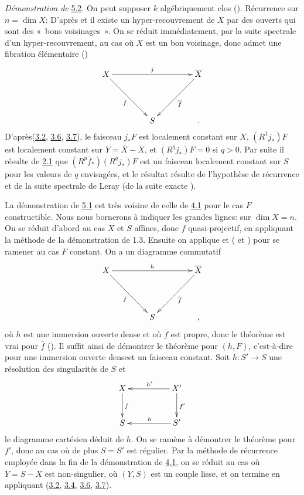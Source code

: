 \documentclass[10pt]{../fichiers-configuration-latex/smfart}
\begin{document}
\noindent
\emph{Démonstration de} \hyperref[XVI.thm5.2]{5.2}. On peut supposer $k$
algébriquement clos ().
Récurrence sur $n=\dim X$: D'après  et il existe un
hyper-recouvrement de $X$ par des ouverts qui sont des « bons
voisinages ». On se réduit immédiatement, par la suite spectrale
d'un hyper-recouvrement, au cas où $X$ est un bon voisinage, donc
admet une fibration élémentaire ()
$$
\xymatrix@=1.5cm{
X \ar[rr]^{j} \ar[rd]_{f}&         &
\bar{X}\ar[ld]^{\bar{f}} \\
             &      S  & .
}
$$
D'après\pageoriginale (\hyperref[XVI.prop3.2]{3.2}, \hyperref[XVI.cor3.6]{3.6}, \hyperref[XVI.thm3.7]{3.7}),
le faisceau $j_{\ast}F$ est
localement constant sur $X$, $(R^{1}j_{\ast})F$ est localement
constant sur $Y=\bar{X}-X$, et $(R^{q}j_{\ast})F=0$ si $q>0$. Par
suite il résulte de \hyperref[XVI.thm2.1]{2.1} que $(R^{p}\bar{f}_{\ast})(R^{q}j_{\ast})F$
est un faisceau localement constant sur $S$ pour les valeurs de $q$
envisagées, et le résultat résulte de l'hypothèse de récurrence et de
la suite spectrale de Leray (\resp de la suite exacte ).

La démonstration de \hyperref[XVI.thm5.1]{5.1} est très voisine 
de celle de \hyperref[XVI.thm4.1]{4.1} pour le cas
$F$ constructible. Nous nous bornerons à indiquer les grandes lignes:
 sur $\dim X=n$. On se réduit d'abord au cas $X$ et $S$
affines, donc $f$ quasi-projectif, en appliquant la méthode de la
démonstration de 1.3. Ensuite on applique  et ( et )
pour se ramener au cas $F$ constant. On a un diagramme commutatif
$$
\xymatrix@=1.5cm{
X \ar[rr]^{h} \ar[rd]_{f}&         &                  \bar{X}\ar[ld]^{\bar{f}}\\
             &      S  & ,                  
}
$$
où $h$ est une immersion ouverte dense et où $\bar{f}$ est propre,
donc le théorème est vrai pour $\bar{f}$ (). Il suffit ainsi de
démontrer le théorème pour $(h,F)$, c'est-à-dire pour une immersion
ouverte dense\pageoriginale et un faisceau constant. Soit
$h:S'\rightarrow S$ une résolution des singularités de $S$ et
$$
\xymatrix@C=1.75cm@R=1cm{
X  \ar[d]^{f} & X' \ar[l]_{h'} \ar[d]^{f'}\\
S          & S' \ar[l]_{h} 
}
$$
le diagramme cartésien déduit de $h$. On se ramène à démontrer le
théorème pour $f'$, donc au cas où de plus $S=S'$ est régulier. Par la
méthode de récurrence employée dans la fin de la démonstration de \hyperref[XVI.thm4.1]{4.1},
on se réduit au cas où $Y=S-X$ est non-singulier, \ie où $(Y,S)$ est
un couple lisse, et on termine en appliquant (\hyperref[XVI.prop3.2]{3.2}, \hyperref[XVI.cor3.4]{3.4},
\hyperref[XVI.cor3.6]{3.6}, \hyperref[XVI.thm3.7]{3.7}).
\end{document}
